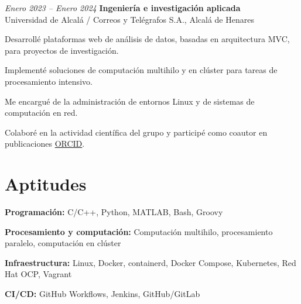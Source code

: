 \vspace{0.2 cm}

\begin{twocolentry}{\textit{Enero 2023 – Enero 2024}}
	\textbf{Ingeniería e investigación aplicada} \\
	Universidad de Alcalá / Correos y Telégrafos S.A., Alcalá de Henares
\end{twocolentry}
\begin{onecolentry}
	\begin{highlights}
		\item Desarrollé plataformas web de análisis de datos, basadas en arquitectura MVC, para proyectos de investigación.
		\item Implementé soluciones de computación multihilo y en clúster para tareas de procesamiento intensivo.
		\item Me encargué de la administración de entornos Linux y de sistemas de computación en red.
		\item Colaboré en la actividad científica del grupo y participé como coautor en publicaciones \href{https://orcid.org/0009-0000-6862-1872}{ORCID}.
	\end{highlights}
\end{onecolentry}

\vspace{-7pt}

\section{Aptitudes}

\begin{onecolentry}
	\textbf{Programación:} C/C++, Python, MATLAB, Bash, Groovy
\end{onecolentry}
\begin{onecolentry}
	\textbf{Procesamiento y computación:} Computación multihilo, procesamiento paralelo, computación en clúster
\end{onecolentry}
\begin{onecolentry}
	\textbf{Infraestructura:} Linux, Docker, containerd, Docker Compose, Kubernetes, Red Hat OCP, Vagrant
\end{onecolentry}
\begin{onecolentry}
	\textbf{CI/CD:} GitHub Workflows, Jenkins, GitHub/GitLab
\end{onecolentry}